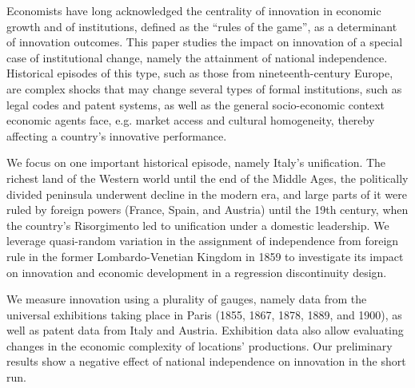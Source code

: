 \noindent Economists have long acknowledged the centrality of innovation in economic growth and of institutions, defined as the “rules of the game”, as a determinant of innovation outcomes. This paper studies the impact on innovation of a special case of institutional change, namely the attainment of national independence. Historical episodes of this type, such as those from nineteenth-century Europe, are complex shocks that may change several types of formal institutions, such as legal codes and patent systems, as well as the general socio-economic context economic agents face, e.g. market access and cultural homogeneity, thereby affecting a country's innovative performance.

\noindent We focus on one important historical episode, namely Italy’s unification. The richest land of the Western world until the end of the Middle Ages, the politically divided peninsula underwent decline in the modern era, and large parts of it were ruled by foreign powers (France, Spain, and Austria) until the 19th century, when the country’s Risorgimento led to unification under a domestic leadership. We leverage quasi-random variation in the assignment of independence from foreign rule in the former Lombardo-Venetian Kingdom in 1859 to investigate its impact on innovation and economic development in a regression discontinuity design.

\noindent We measure innovation using a plurality of gauges, namely data from the universal exhibitions taking place in Paris (1855, 1867, 1878, 1889, and 1900), as well as patent data from Italy and Austria. Exhibition data also allow evaluating changes in the economic complexity of locations’ productions. Our preliminary results show a negative effect of national independence on innovation in the short run.
